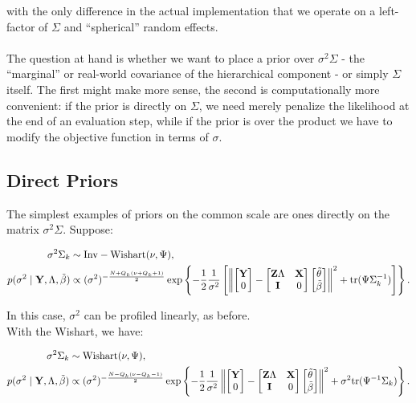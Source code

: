 \documentclass[10pt]{article}
\begin{document}
\noindent with the only difference in the actual implementation that
we operate on a left-factor of $\Sigma$ and ``spherical'' random
effects. \\ \\

The question at hand is whether we want to place a prior over
$\sigma^2\Sigma$ - the ``marginal'' or real-world covariance of the
hierarchical component - or simply $\Sigma$ itself. The first might
make more sense, the second is computationally more convenient: if the prior is directly on $\Sigma$, we need merely penalize the
likelihood at the end of an evaluation step, while if the prior is over
the product we have to modify the objective function in terms of
$\sigma$.

\subsection*{Direct Priors}

The simplest examples of priors on the common scale are ones directly
on the matrix $\sigma^2\Sigma$. Suppose:

\begin{align*}
\sigma^2\Sigma_k & \sim \mathrm{Inv-Wishart}(\nu, \Psi), \\
p(\sigma^2 \mid {\bf Y}, \Lambda, \tilde\beta) & \propto
(\sigma^2)^{-\frac{N+Q_k(\nu + Q_k + 1)}{2}}
\exp\left\{-\frac{1}{2}\frac{1}{\sigma^2} \left[
\left\|\begin{bmatrix}{\bf Y} \\ 0 \end{bmatrix}
- \begin{bmatrix} {\bf Z}\Lambda & {\bf X} \\ {\bf I} &
  0 \end{bmatrix}
\begin{bmatrix}\tilde\theta \\ \tilde\beta \end{bmatrix}
\right\|^2
+ \mathrm{tr}(\Psi\Sigma_k^{-1})\right]\right\}.
\end{align*}

\noindent In this case, $\sigma^2$ can be profiled linearly, as
before. \\

With the Wishart, we have:

\begin{align*}
\sigma^2\Sigma_k & \sim \mathrm{Wishart}(\nu, \Psi), \\
p(\sigma^2 \mid {\bf Y}, \Lambda, \tilde\beta) & \propto
(\sigma^2)^{-\frac{N-Q_k(\nu - Q_k - 1)}{2}}
\exp\left\{-\frac{1}{2}\frac{1}{\sigma^2}
\left\|\begin{bmatrix}{\bf Y} \\ 0 \end{bmatrix}
- \begin{bmatrix} {\bf Z}\Lambda & {\bf X} \\ {\bf I} &
  0 \end{bmatrix}
\begin{bmatrix}\tilde\theta \\ \tilde\beta \end{bmatrix}
\right\|^2
+ \sigma^2\mathrm{tr}(\Psi^{-1}\Sigma_k)\right\}.
\end{align*}
\end{document}
